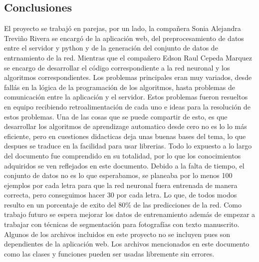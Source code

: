 \documentclass{article}
\begin{document}
\subsection{Conclusiones}
El proyecto se trabajó en parejas, por un lado, la compañera Sonia Alejandra Treviño Rivera se encargó de la aplicación web, del preprocesamiento de datos entre el servidor y python y de la generación del conjunto 
de datos de entrnamiento de la red. Mientras que el compañero Edson Raul Cepeda Marquez se encargo de desarrollar el código correspondiente a la red neuronal y los algoritmos correspondientes. Los problemas principales eran muy variados,
desde fallás en la lógica de la programación de los algoritmos, hasta problemas de comunicación entre la aplicación y el servidor. Estos problemas fueron resueltos en equipo recibiendo retroalimentación de cada uno e ideas para la resolución de estos problemas. 
Una de las cosas que se puede compartir de esto, es que desarrollar los algoritmos de aprendizage automatico desde cero no es lo lo más eficiente, pero en cuestiones didacticas deja unas buenas bases del tema, lo que despues se traduce en la facilidad para usar
librerias. Todo lo expuesto a lo largo del documento fue comprendido en su totalidad, por lo que los conocimientos adquiridos se ven reflejados en este documento. 
Debido a la falta de tiempo, el conjunto de datos no es lo que esperabamos, se planeaba por lo menos 100 ejemplos por cada letra para que la red neuronal fuera entrenada de manera correcta, pero conseguimos hacer 30 por cada letra. Lo que, de todos modos
resulto en un porcentaje de exito del 80\% de las predicciones de la red. Como trabajo futuro se espera mejorar los datos de entrenamiento además de empezar a trabajar con técnicas de segmentación para fotografías con texto manuscrito.
Algunos de los archivos incluidos en este proyecto no se incluyen pues son dependientes de la aplicación web. Los archivos mencionados en este documento como las clases y funciones pueden ser usadas libremente sin errores.
\end{document}
